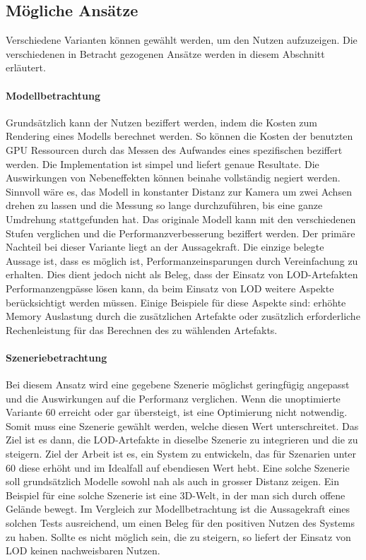 \subsection{Mögliche Ansätze}

Verschiedene Varianten können gewählt werden, um den Nutzen aufzuzeigen. Die verschiedenen in Betracht gezogenen Ansätze werden in diesem Abschnitt erläutert.

\paragraph{Modellbetrachtung}
Grundsätzlich kann der Nutzen beziffert werden, indem die Kosten zum Rendering eines Modells berechnet werden. So können die Kosten der benutzten GPU Ressourcen durch das Messen des Aufwandes eines spezifischen  beziffert werden. Die Implementation ist simpel und liefert genaue Resultate. Die Auswirkungen von Nebeneffekten können beinahe vollständig negiert werden.
Sinnvoll wäre es, das Modell in konstanter Distanz zur Kamera um zwei Achsen drehen zu lassen und die Messung so lange durchzuführen, bis eine ganze Umdrehung stattgefunden hat. Das originale Modell kann mit den verschiedenen Stufen verglichen und die Performanzverbesserung beziffert werden.
Der primäre Nachteil bei dieser Variante liegt an der Aussagekraft. Die einzige belegte Aussage ist, dass es möglich ist, Performanzeinsparungen durch Vereinfachung zu erhalten. Dies dient jedoch nicht als Beleg, dass der Einsatz von LOD-Artefakten Performanzengpässe lösen kann, da beim Einsatz von LOD weitere Aspekte berücksichtigt werden müssen. Einige Beispiele für diese Aspekte sind: erhöhte Memory Auslastung durch die zusätzlichen Artefakte oder zusätzlich erforderliche Rechenleistung für das Berechnen des zu wählenden Artefakts.

\paragraph{Szeneriebetrachtung}
Bei diesem Ansatz wird eine gegebene Szenerie möglichst geringfügig angepasst und die Auswirkungen auf die Performanz verglichen.
Wenn die unoptimierte Variante 60  erreicht oder gar übersteigt, ist eine Optimierung nicht notwendig. Somit muss eine Szenerie gewählt werden, welche diesen Wert unterschreitet.
Das Ziel ist es dann, die LOD-Artefakte in dieselbe Szenerie zu integrieren und die  zu steigern. Ziel der Arbeit ist es, ein System zu entwickeln, das für Szenarien unter 60  diese erhöht und im Idealfall auf ebendiesen Wert hebt.
Eine solche Szenerie soll grundsätzlich Modelle sowohl nah als auch in grosser Distanz zeigen. Ein Beispiel für eine solche Szenerie ist eine 3D-Welt, in der man sich durch offene Gelände bewegt.
Im Vergleich zur Modellbetrachtung ist die Aussagekraft eines solchen Tests ausreichend, um einen Beleg für den positiven Nutzen des Systems zu haben. Sollte es nicht möglich sein, die  zu steigern, so liefert der Einsatz von LOD keinen nachweisbaren Nutzen.

